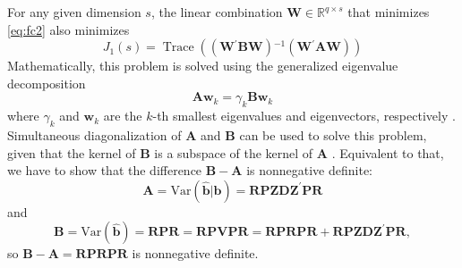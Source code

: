 \documentclass[12pt]{article} %
\newcommand{\inv}{\ensuremath{^{-1}}}
\newcommand{\trans}{\ensuremath{^\prime}}
\newcommand{\var}{\ensuremath{\mathrm{Var}}}
\DeclareMathOperator{\tr}{Trace}
\begin{document}
%


For any given dimension $s$, the linear combination $\bm{W} \in \mathbb{R}^{q \times s}$ that minimizes \eqref{eq:fc2} also minimizes
%
\begin{equation}\label{eq:minimize}
J_1(s) = \tr\left( \left(\bm{W\trans B W} \right)\inv \left(\bm{W\trans A W}\right) \right)
\end{equation}
%
Mathematically, this problem is solved using the generalized eigenvalue decomposition
%
\begin{equation}\label{eq:geigen}
	\bm{Aw}_k = \gamma_k \bm{Bw}_k
\end{equation}
%
where $\gamma_k$ and $\bm{w}_k$ are the $k$-th smallest eigenvalues and eigenvectors, respectively \citep{Fukunaga:1990}. 
Simultaneous diagonalization of $\bm{A}$ and $\bm{B}$ can be used to solve this problem, given that the kernel of $\bm{B}$ is a subspace of the kernel of $\bm{A}$ \citep{deLeeuw:1982to}.
Equivalent to that, we have to show that the difference $\bm{B} - \bm{A}$ is nonnegative definite:
\[
	\bm{A} =  \var(\widehat{\bm{b}} | \bm{b} ) = \bm{RPZDZ}^\prime \bm{PR}
\]
and
\[
	\bm{B} = \var(\widehat{\bm{b}}) =  \bm{RPR} =  \bm{RPVPR}  = \bm{RPRPR} + \bm{RPZDZ}^\prime\bm{PR},
\]
so $\bm{B}-\bm{A} =  \bm{RPRPR}$ is nonnegative definite.

%
\end{document}
